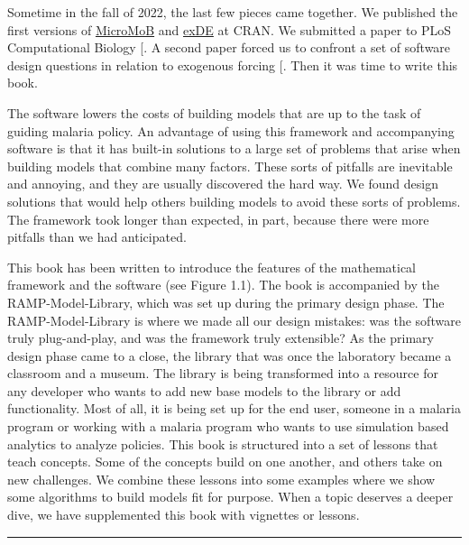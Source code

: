 \documentclass[
]{book}
\begin{document}
Sometime in the fall of 2022, the last few pieces came together. We published the first versions of \href{https://cran.r-project.org/package=MicroMoB}{MicroMoB} and \href{https://CRAN.R-project.org/package=exDE}{exDE} at CRAN. We submitted a paper to PLoS Computational Biology {[}\citeproc{ref-WuSL2023SpatialDynamics}{11}{]}. A second paper forced us to confront a set of software design questions in relation to exogenous forcing {[}\citeproc{ref-addCite}{\textbf{addCite?}}{]}.
Then it was time to write this book.

The software lowers the costs of building models that are up to the task of guiding malaria policy.
An advantage of using this framework and accompanying software is that it has built-in solutions to a large set of problems that arise when building models that combine many factors.
These sorts of pitfalls are inevitable and annoying, and they are usually discovered the hard way.
We found design solutions that would help others building models to avoid these sorts of problems. The framework took longer than expected, in part, because there were more pitfalls than we had anticipated.

This book has been written to introduce the features of the mathematical framework and the software (see Figure 1.1). The book is accompanied by the RAMP-Model-Library, which was set up during the primary design phase. The RAMP-Model-Library is where we made all our design mistakes: was the software truly plug-and-play, and was the framework truly extensible? As the primary design phase came to a close, the library that was once the laboratory became a classroom and a museum. The library is being transformed into a resource for any developer who wants to add new base models to the library or add functionality. Most of all, it is being set up for the end user, someone in a malaria program or working with a malaria program who wants to use simulation based analytics to analyze policies. This book is structured into a set of lessons that teach concepts. Some of the concepts build on one another, and others take on new challenges. We combine these lessons into some examples where we show some algorithms to build models fit for purpose. When a topic deserves a deeper dive, we have supplemented this book with vignettes or lessons.

\begin{center}\rule{0.5\linewidth}{0.5pt}\end{center}
\end{document}
